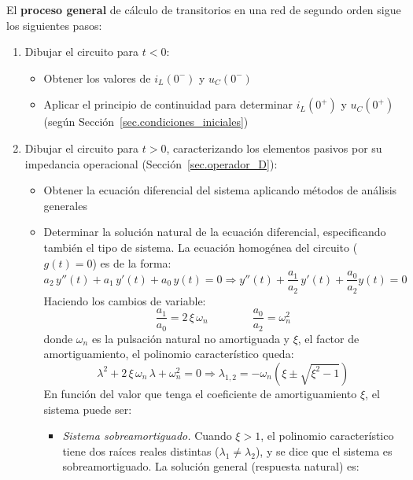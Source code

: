 	El \textbf{proceso general} de cálculo de transitorios en una red de segundo orden sigue los siguientes pasos:
	\begin{enumerate}
	\item Dibujar el circuito para $t < 0$:
        \begin{itemize}
        \item Obtener los valores de $i_L(0^-)$ y $u_C(0^-)$
        \item Aplicar el principio de continuidad para determinar $i_L(0^+)$ y $u_C(0^+)$ (según Sección~\ref{sec.condiciones_iniciales})
        \end{itemize}
    \item Dibujar el circuito para \(t > 0\), caracterizando los elementos pasivos por su impedancia operacional (Sección~\ref{sec.operador_D}):
        \begin{itemize}
        \item Obtener la ecuación diferencial del sistema aplicando métodos de análisis generales 
        \item Determinar la solución natural de la ecuación diferencial, especificando también el tipo de sistema. La ecuación homogénea del circuito ($g(t)=0$) es de la forma:
	\begin{equation*}
	    a_2\,y''(t)+a_1\,y'(t)+a_0\,y(t)=0\Rightarrow {y''(t)+\dfrac{a_1}{a_2}\,y'(t)+\dfrac{a_0}{a_2}y(t)=0}
	\end{equation*}
	Haciendo los cambios de variable:
	\begin{equation}\label{eq.xi-omega_n}
	    {\dfrac{a_1}{a_0}=2\,\xi\,\omega_n}\qquad \qquad {\dfrac{a_0}{a_2}=\omega_n^2}
	\end{equation}
	donde $\omega_n$ es la pulsación natural no amortiguada y $\xi$, el factor de amortiguamiento, el polinomio característico queda:
	\begin{equation*}
	    \lambda^2+2\,\xi\,\omega_n\,\lambda + \omega_n^2=0 \Rightarrow \lambda_{1,2}=-\omega_n\left(\xi\pm\sqrt{\xi^2-1} \right)
	\end{equation*}
	En función del valor que tenga el coeficiente de amortiguamiento $\xi$, el sistema puede ser: 
	\begin{itemize}
	    \item \textit{Sistema sobreamortiguado.} Cuando $\xi>1$, el polinomio característico tiene {dos raíces reales distintas} ($\lambda_1\neq\lambda_2$), y se dice que el sistema es {sobreamortiguado}. La solución general (respuesta natural) es:
	\begin{equation*}

\end{equation*}
\end{itemize}
\end{itemize}
\end{enumerate}

